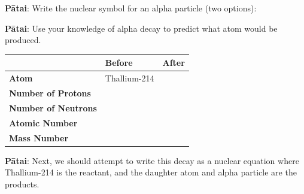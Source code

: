 \documentclass[12pt]{report}
\begin{document}
\noindent\textbf{Pātai}: Write the nuclear symbol for an alpha particle (two options):
\vspace{0.5cm}

\noindent\textbf{Pātai}: Use your knowledge of alpha decay to predict what atom would be produced.

\begin{table}[ht]
\centering
\begin{tabular}{|l|p{3cm}|p{3cm}|}
\hline
                            & \textbf{Before} & \textbf{After} \\ \hline
\textbf{Atom}               & Thallium-214    &                \\ \hline
\textbf{Number of Protons}  &                 &                \\ \hline
\textbf{Number of Neutrons} &                 &                \\ \hline
\textbf{Atomic Number}      &                 &                \\ \hline
\textbf{Mass Number}        &                 &                \\ \hline
\end{tabular}
\end{table}

\noindent\textbf{Pātai}: Next, we should attempt to write this decay as a nuclear equation where Thallium-214 is the reactant, and the daughter atom and alpha particle are the products.
\vspace{1cm}
\end{document}
